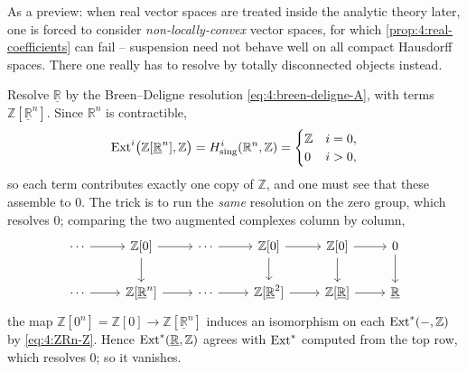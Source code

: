 \begin{remark}
\label{rmk:4:non-convex-preview}
As a preview: when real vector spaces are treated inside the analytic theory
later, one is forced to consider \emph{non-locally-convex} vector spaces, for
which \cref{prop:4:real-coefficients} can fail -- suspension need not behave
well on all compact Hausdorff spaces. There one really has to resolve by totally
disconnected objects instead.
\end{remark}

\begin{example}[$\Ext^{i}(\mathbb{R},\mathbb{Z})=0$, worked out]
\label{ex:4:R-Z-worked}
Resolve $\underline{\mathbb{R}}$ by the Breen--Deligne resolution
\eqref{eq:4:breen-deligne-A}, with terms $\mathbb{Z}[\underline{\mathbb{R}}^{n}]$.
Since $\mathbb{R}^{n}$ is contractible,
\begin{equation}
\label{eq:4:ZRn-Z}
\operatorname{Ext}^{i}\bigl(\mathbb{Z}[\underline{\mathbb{R}}^{n}],\mathbb{Z}\bigr)
=H^{i}_{\mathrm{sing}}(\mathbb{R}^{n},\mathbb{Z})=
\begin{cases}
\mathbb{Z} & i=0,\\
0 & i>0,
\end{cases}
\end{equation}
so each term contributes exactly one copy of $\mathbb{Z}$, and one must see that
these assemble to $0$. The trick is to run the \emph{same} resolution on the zero
group, which resolves $0$; comparing the two augmented complexes column by
column,
\[
\begin{tikzcd}
\cdots \arrow[r] & \mathbb{Z}[0] \arrow[r] \arrow[d] & \cdots \arrow[r] & \mathbb{Z}[0] \arrow[r] \arrow[d] & \mathbb{Z}[0] \arrow[r] \arrow[d] & 0 \arrow[d] \\
\cdots \arrow[r] & \mathbb{Z}[\underline{\mathbb{R}}^{n}] \arrow[r] & \cdots \arrow[r] & \mathbb{Z}[\underline{\mathbb{R}}^{2}] \arrow[r] & \mathbb{Z}[\underline{\mathbb{R}}] \arrow[r] & \underline{\mathbb{R}}
\end{tikzcd}
\]
the map $\mathbb{Z}[0^{n}]=\mathbb{Z}[0]\to\mathbb{Z}[\underline{\mathbb{R}}^{n}]$
induces an isomorphism on each $\operatorname{Ext}^{\ast}(-,\mathbb{Z})$ by \eqref{eq:4:ZRn-Z}.
Hence $\operatorname{Ext}^{\ast}(\underline{\mathbb{R}},\mathbb{Z})$ agrees with
$\operatorname{Ext}^{\ast}$ computed from the top row, which resolves $0$; so it vanishes.
\end{example}


